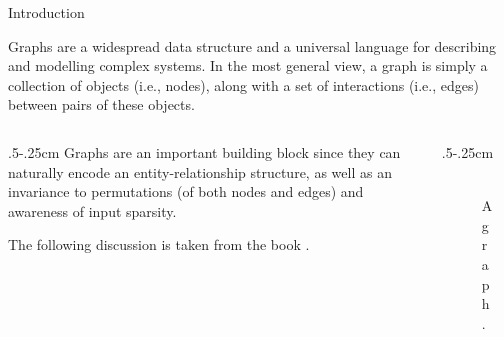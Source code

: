 \documentclass[10pt, aspectratio=169, compress, protectframetitle, handout]{beamer}
\begin{document}
\begin{frame}{Introduction}
    
    Graphs are a widespread data structure and a universal language for describing and modelling complex systems. In the most general view, a graph is simply a collection of objects (i.e., nodes), along with a set of interactions (i.e., edges) between pairs of these objects. 
    \bigskip
    
    \begin{columns}[onlytextwidth]
        \begin{column}{.5\textwidth-.25cm}
            Graphs are an important building block since they can naturally encode an \alert{entity-relationship structure}, as well as an \alert{invariance to permutations} (of both nodes and edges) and awareness of \alert{input sparsity}.
            \bigskip
            
            The following discussion is taken from the book \cite{HamiltonGRLBook}.
        \end{column}
        \begin{column}{.5\textwidth-.25cm}
            \begin{figure}
                \centering
                \includegraphics[width=3.8cm]{figures/Graph}
                \caption{A graph.}
            \end{figure}
        \end{column}
    \end{columns}
    
\end{frame}
\end{document}
